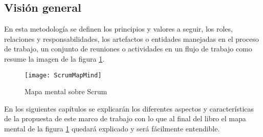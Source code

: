 \subsection{Visión general}

En esta metodología se definen los principios y valores a seguir, los roles, relaciones y responsabilidades, los artefactos o entidades manejadas en el proceso de trabajo, un conjunto de reuniones o actividades en un flujo de trabajo como resume la imagen de la figura \ref{fig:ScrumMapMind}.

\begin{figure}[h]
  \centering
  \texttt{[image: ScrumMapMind]}
  \caption{Mapa mental sobre Scrum}
  \centering
  \label{fig:ScrumMapMind} %
\end{figure}

En los siguientes capítulos se explicarán los diferentes aspectos y características de la propuesta de este marco de trabajo con lo que 
al final del libro el mapa mental de la figura \ref{fig:ScrumMapMind} quedará explicado y será fácilmente entendible. 

